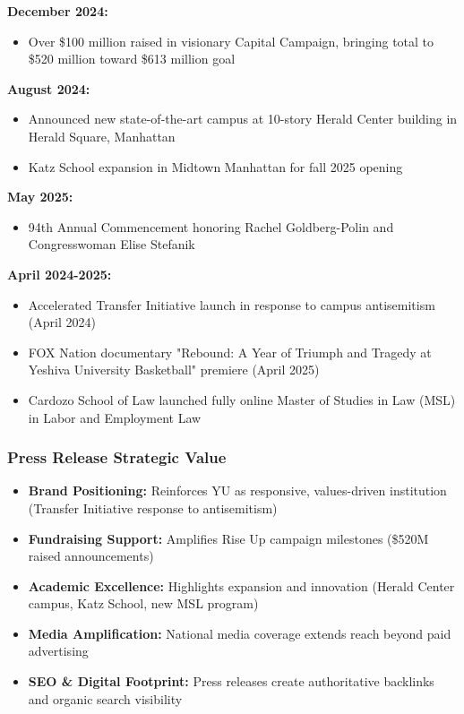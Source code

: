 \documentclass[12pt,letterpaper]{article}
\begin{document}
\textbf{December 2024:}
\begin{itemize}[leftmargin=*]
    \item Over \$100 million raised in visionary Capital Campaign, bringing total to \$520 million toward \$613 million goal
\end{itemize}

\textbf{August 2024:}
\begin{itemize}[leftmargin=*]
    \item Announced new state-of-the-art campus at 10-story Herald Center building in Herald Square, Manhattan
    \item Katz School expansion in Midtown Manhattan for fall 2025 opening
\end{itemize}

\textbf{May 2025:}
\begin{itemize}[leftmargin=*]
    \item 94th Annual Commencement honoring Rachel Goldberg-Polin and Congresswoman Elise Stefanik
\end{itemize}

\textbf{April 2024-2025:}
\begin{itemize}[leftmargin=*]
    \item Accelerated Transfer Initiative launch in response to campus antisemitism (April 2024)
    \item FOX Nation documentary "Rebound: A Year of Triumph and Tragedy at Yeshiva University Basketball" premiere (April 2025)
    \item Cardozo School of Law launched fully online Master of Studies in Law (MSL) in Labor and Employment Law
\end{itemize}

\subsubsection{Press Release Strategic Value}
\begin{itemize}[leftmargin=*]
    \item \textbf{Brand Positioning:} Reinforces YU as responsive, values-driven institution (Transfer Initiative response to antisemitism)
    \item \textbf{Fundraising Support:} Amplifies Rise Up campaign milestones (\$520M raised announcements)
    \item \textbf{Academic Excellence:} Highlights expansion and innovation (Herald Center campus, Katz School, new MSL program)
    \item \textbf{Media Amplification:} National media coverage extends reach beyond paid advertising
    \item \textbf{SEO \& Digital Footprint:} Press releases create authoritative backlinks and organic search visibility
\end{itemize}
\end{document}
